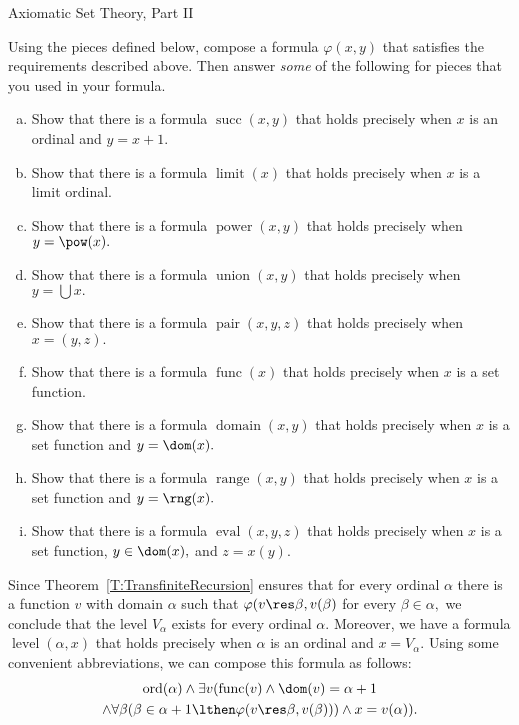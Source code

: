 \begin{unit}{Axiomatic Set Theory, Part II}
\begin{problem}
  Using the pieces defined below, compose a formula \(\varphi(x,y)\) that satisfies the requirements described above.
  Then answer \emph{some} of the following for pieces that you used in your formula.
  \begin{enumerate}[(a)]
  \item Show that there is a formula \(\operatorname{succ}(x,y)\) that holds precisely when \(x\) is an ordinal and \(y = x+1.\)
  \item Show that there is a formula \(\operatorname{limit}(x)\) that holds precisely when \(x\) is a limit ordinal.
  \item Show that there is a formula \(\operatorname{power}(x,y)\) that holds precisely when \(y = \pow(x).\)
  \item Show that there is a formula \(\operatorname{union}(x,y)\) that holds precisely when \(y = \bigcup x.\)
  \item Show that there is a formula \(\operatorname{pair}(x,y,z)\) that holds precisely when \(x = (y,z).\)
  \item Show that there is a formula \(\operatorname{func}(x)\) that holds precisely when \(x\) is a set function.
  \item Show that there is a formula \(\operatorname{domain}(x,y)\) that holds precisely when \(x\) is a set function and \(y = \dom(x).\)
  \item Show that there is a formula \(\operatorname{range}(x,y)\) that holds precisely when \(x\) is a set function and \(y = \rng(x).\)
  \item Show that there is a formula \(\operatorname{eval}(x,y,z)\) that holds precisely when \(x\) is a set function, \(y \in \dom(x),\) and \(z = x(y).\)
  \end{enumerate}
\end{problem}

Since Theorem~\ref{T:TransfiniteRecursion} ensures that for every ordinal \(\alpha\) there is a function \(v\) with domain \(\alpha\) such that \(\varphi(v \res \beta, v(\beta)\) for every \(\beta \in \alpha,\) we conclude that the level \(V_\alpha\) exists for every ordinal \(\alpha.\)
Moreover, we have a formula \(\operatorname{level}(\alpha,x)\) that holds precisely when \(\alpha\) is an ordinal and \(x = V_\alpha.\) 
Using some convenient abbreviations, we can compose this formula as
follows: 
\begin{multline*}
  \operatorname{ord}(\alpha) \land \exists v (\operatorname{func}(v)
  \land \dom(v) = \alpha+1\\\land \forall \beta(\beta \in \alpha+1
  \lthen \varphi(v \res \beta, v(\beta))) \land x = v(\alpha)).
\end{multline*}


\end{unit}
